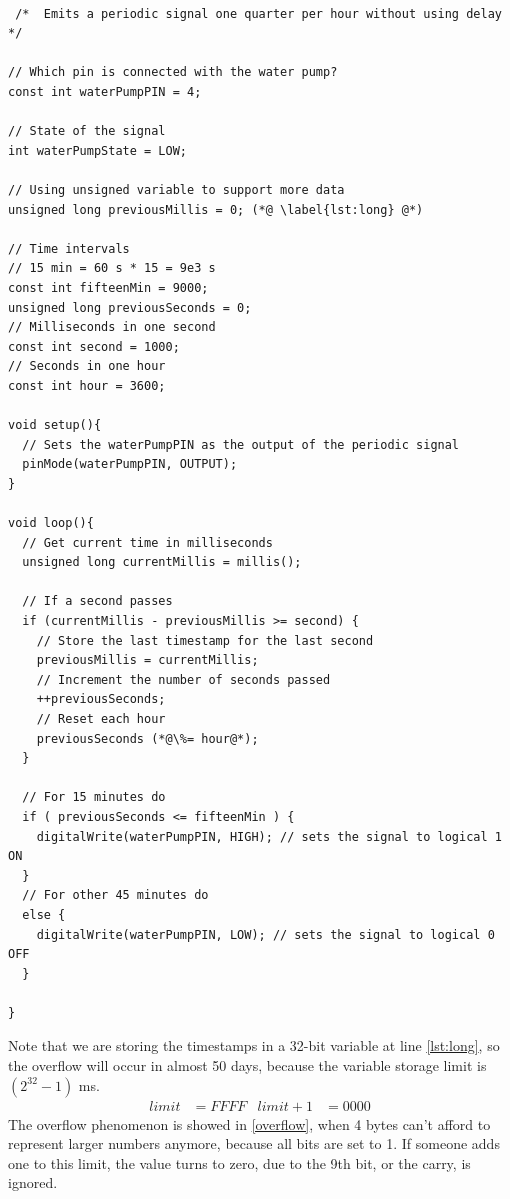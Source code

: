 \begin{lstlisting}[style=Arduino,
                    caption=Water Cycle Code without Delays,
                    label=lst:wcReview]

 /*  Emits a periodic signal one quarter per hour without using delay */

// Which pin is connected with the water pump?
const int waterPumpPIN = 4;

// State of the signal
int waterPumpState = LOW;

// Using unsigned variable to support more data
unsigned long previousMillis = 0; (*@ \label{lst:long} @*)

// Time intervals
// 15 min = 60 s * 15 = 9e3 s
const int fifteenMin = 9000;
unsigned long previousSeconds = 0;
// Milliseconds in one second
const int second = 1000;
// Seconds in one hour
const int hour = 3600;

void setup(){
  // Sets the waterPumpPIN as the output of the periodic signal
  pinMode(waterPumpPIN, OUTPUT);
}

void loop(){
  // Get current time in milliseconds
  unsigned long currentMillis = millis();

  // If a second passes
  if (currentMillis - previousMillis >= second) {
    // Store the last timestamp for the last second
    previousMillis = currentMillis;
    // Increment the number of seconds passed
    ++previousSeconds;
    // Reset each hour
    previousSeconds (*@\%= hour@*);
  }

  // For 15 minutes do
  if ( previousSeconds <= fifteenMin ) {
    digitalWrite(waterPumpPIN, HIGH); // sets the signal to logical 1 ON
  }
  // For other 45 minutes do
  else {
    digitalWrite(waterPumpPIN, LOW); // sets the signal to logical 0 OFF
  }
  
}
\end{lstlisting}

Note that we are storing the timestamps in a 32-bit variable at line \ref{lst:long},
so the overflow will occur in almost 50 days,
because the variable storage limit is $ ( 2^{32} -1 ) $ ms.
\begin{align}
    limit& = FFFF& limit+1& = 0000 \label{overflow}
\end{align}
The overflow phenomenon is showed in \eqref{overflow},
when 4 bytes can't afford to represent larger numbers anymore,
because all bits are set to 1.
If someone adds one to this limit,
the value turns to zero,
due to the 9th bit, or the carry, is ignored.

